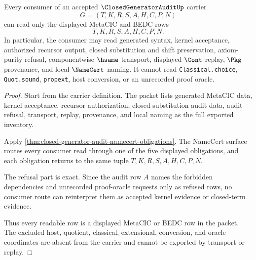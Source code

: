 \begin{theorem}
\label{thm:closed-generator-audit-nonescape}
Every consumer of an accepted $\ClosedGeneratorAuditUp$ carrier
$$
G=(T,K,R,S,A,H,C,P,N)
$$
can read only the displayed MetaCIC and BEDC rows
$$
T,K,R,S,A,H,C,P,N.
$$
In particular, the consumer may read generated syntax, kernel acceptance, authorized recursor output, closed substitution and shift preservation, axiom-purity refusal, componentwise $\hsame$ transport, displayed $\Cont$ replay, $\Pkg$ provenance, and local $\NameCert$ naming. It cannot read \texttt{Classical.choice}, \texttt{Quot.sound}, \texttt{propext}, host conversion, or an unrecorded proof oracle.
\end{theorem}
\begin{proof}
Start from the carrier definition. The packet lists generated MetaCIC data, kernel acceptance, recursor authorization, closed-substitution audit data, audit refusal, transport, replay, provenance, and local naming as the full exported inventory.

Apply \autoref{thm:closed-generator-audit-namecert-obligations}. The NameCert surface routes every consumer read through one of the five displayed obligations, and each obligation returns to the same tuple $T,K,R,S,A,H,C,P,N$.

The refusal part is exact. Since the audit row $A$ names the forbidden dependencies and unrecorded proof-oracle requests only as refused rows, no consumer route can reinterpret them as accepted kernel evidence or closed-term evidence.

Thus every readable row is a displayed MetaCIC or BEDC row in the packet. The excluded host, quotient, classical, extensional, conversion, and oracle coordinates are absent from the carrier and cannot be exported by transport or replay.
\end{proof}

